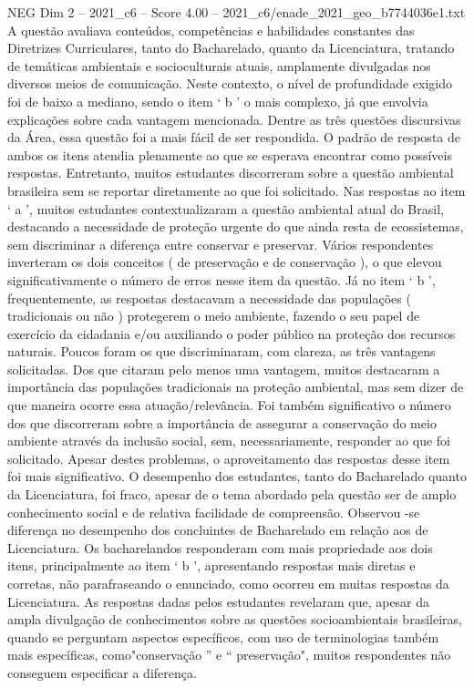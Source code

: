 \begin{textsample}{NEG Dim 2 – 2021\_c6 – Score 4.00 – 2021\_c6/enade\_2021\_geo\_b7744036e1.txt}
A questão avaliava conteúdos, competências e habilidades constantes das Diretrizes Curriculares, tanto do Bacharelado, quanto da Licenciatura, tratando de temáticas ambientais e socioculturais atuais, amplamente divulgadas nos diversos meios de comunicação.
Neste contexto, o nível de profundidade exigido foi de baixo a mediano, sendo o item ‘ b ’ o mais complexo, já que envolvia explicações sobre cada vantagem mencionada.
Dentre as três questões discursivas da Área, essa questão foi a mais fácil de ser respondida.
O padrão de resposta de ambos os itens atendia plenamente ao que se esperava encontrar como possíveis respostas.
Entretanto, muitos estudantes discorreram sobre a questão ambiental brasileira sem se reportar diretamente ao que foi solicitado.
Nas respostas ao item ‘ a ’, muitos estudantes contextualizaram a questão ambiental atual do Brasil, destacando a necessidade de proteção urgente do que ainda resta de ecossistemas, sem discriminar a diferença entre conservar e preservar.
Vários respondentes inverteram os dois conceitos ( de preservação e de conservação ), o que elevou significativamente o número de erros nesse item da questão.
Já no item ‘ b ’, frequentemente, as respostas destacavam a necessidade das populações ( tradicionais ou não ) protegerem o meio ambiente, fazendo o seu papel de exercício da cidadania e/ou auxiliando o poder público na proteção dos recursos naturais.
Poucos foram os que discriminaram, com clareza, as três vantagens solicitadas.
Dos que citaram pelo menos uma vantagem, muitos destacaram a importância das populações tradicionais na proteção ambiental, mas sem dizer de que maneira ocorre essa atuação/relevância.
Foi também significativo o número dos que discorreram sobre a importância de assegurar a conservação do meio ambiente através da inclusão social, sem, necessariamente, responder ao que foi solicitado.
Apesar destes problemas, o aproveitamento das respostas desse item foi mais significativo.
O desempenho dos estudantes, tanto do Bacharelado quanto da Licenciatura, foi fraco, apesar de o tema abordado pela questão ser de amplo conhecimento social e de relativa facilidade de compreensão.
Observou -se diferença no desempenho dos concluintes de Bacharelado em relação aos de Licenciatura.
Os bacharelandos responderam com mais propriedade aos dois itens, principalmente ao item ‘ b ’, apresentando respostas mais diretas e corretas, não parafraseando o enunciado, como ocorreu em muitas respostas da Licenciatura.
As respostas dadas pelos estudantes revelaram que, apesar da ampla divulgação de conhecimentos sobre as questões socioambientais brasileiras, quando se perguntam aspectos específicos, com uso de terminologias também mais específicas, como"conservação ” e “ preservação", muitos respondentes não conseguem especificar a diferença.

\end{textsample}
